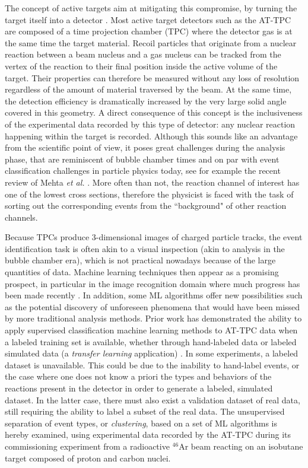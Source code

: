 \documentclass[review,number,sort&compress]{elsarticle}
\begin{document}
The concept of active targets aim at mitigating this compromise, by turning the target itself into a detector \cite{BECEIRONOVO2015}. Most active target detectors such as the AT-TPC are composed of a time projection chamber (TPC) where the detector gas is at the same time the target material. Recoil particles that originate from a nuclear reaction between a beam nucleus and a gas nucleus can be tracked from the vertex of the reaction to their final position inside the active volume of the target. Their properties can therefore be measured without any loss of resolution regardless of the amount of material traversed by the beam. At the same time, the detection efficiency is dramatically increased by the very large solid angle covered in this geometry. A direct consequence of this concept is the inclusiveness of the experimental data recorded by this type of detector: any nuclear reaction happening within the target is recorded. Although this sounds like an advantage from the scientific point of view, it poses great challenges during the analysis phase, that are reminiscent of bubble chamber times and on par with event classification challenges in particle physics today, see for example the recent review of Mehta {\em et al.} \cite{mehta2019}. More often than not, the reaction channel of interest has one of the lowest cross sections, therefore the physicist is faced with the task of sorting out the corresponding events from the ``background" of other reaction channels. 

Because TPCs produce 3-dimensional images of charged particle tracks, the event identification task is often akin to a visual inspection (akin to analysis in the bubble chamber era), which is not practical nowadays because of the large quantities of data. Machine learning techniques then appear as a promising prospect, in particular in the image recognition domain where much progress has been made recently \cite{mehta2019}. In addition, some ML algorithms offer new possibilities such as the potential discovery of unforeseen phenomena that would have been missed by more traditional analysis methods. Prior work has demonstrated the ability to apply supervised classification machine learning methods to AT-TPC data when a labeled training set is available, whether through hand-labeled data or labeled simulated data (a {\em transfer learning} application) \cite{Kuchera2019}. In some experiments, a labeled dataset is unavailable. This could be  due to the inability to hand-label events, or the case where one does not know a priori the types and behaviors of the reactions present in the detector in order to generate a labeled, simulated dataset. In the latter case, there must also exist a validation dataset of real data, still requiring the ability to label a subset of the real data. The unsupervised separation of event types, or {\em clustering}, based on a set of ML algorithms is hereby examined, using experimental data recorded by the AT-TPC during its commissioning experiment from a radioactive $^{46}$Ar beam reacting on an isobutane target composed of proton and carbon nuclei. 
\end{document}
